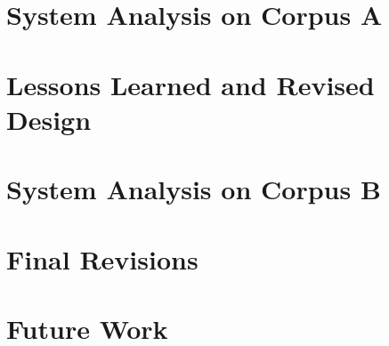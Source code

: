 \documentclass[11pt,letterpaper]{article}
\begin{document}
\section{System Analysis on Corpus A}

\section{Lessons Learned and Revised Design}

\section{System Analysis on Corpus B}

\section{Final Revisions}

\section{Future Work}


\nocite{*}




\label{lastpage}
\end{document}
